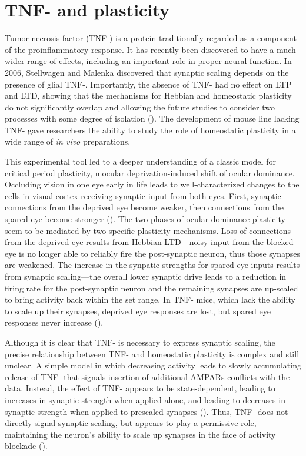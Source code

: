 \section{TNF-\textalpha{} and plasticity}

Tumor necrosis factor \textalpha{} (TNF-\textalpha{}) is a protein traditionally regarded as a component of the proinflammatory response. It has recently been discovered to have a much wider range of effects, including an important role in proper neural function. In 2006, Stellwagen and Malenka discovered that synaptic scaling depends on the presence of glial TNF-\textalpha{}. Importantly, the absence of TNF-\textalpha{} had no effect on LTP and LTD, showing that the mechanisms for Hebbian and homeostatic plasticity do not significantly overlap and allowing the future studies to consider two processes with some degree of isolation (\cite{Stellwagen2006}). The development of mouse line lacking TNF-\textalpha{} gave researchers the ability to study the role of homeostatic plasticity in a wide range of \textit{in vivo} preparations.

This experimental tool led to a deeper understanding of a classic model for critical period plasticity, mocular deprivation-induced shift of ocular dominance. Occluding vision in one eye early in life leads to well-characterized changes to the cells in visual cortex receiving synaptic input from both eyes. First, synaptic connections from the deprived eye become weaker, then connections from the spared eye become stronger (\cite{Frenkel2004}). The two phases of ocular dominance plasticity seem to be mediated by two specific plasticity mechanisms. Loss of connections from the deprived eye results from Hebbian LTD---noisy input from the blocked eye is no longer able to reliably fire the post-synaptic neuron, thus those synapses are weakened. The increase in the synpatic strengths for spared eye inputs results from synaptic scaling---the overall lower synaptic drive leads to a reduction in firing rate for the post-synaptic neuron and the remaining synapses are up-scaled to bring activity back within the set range. In TNF-\textalpha{} mice, which lack the ability to scale up their synapses, deprived eye responses are lost, but spared eye responses never increase (\cite{Kaneko2008}).

Although it is clear that TNF-\textalpha{} is necessary to express synaptic scaling, the precise relationship between TNF-\textalpha{} and homeostatic plasticity is complex and still unclear. A simple model in which decreasing activity leads to slowly accumulating release of TNF-\textalpha{} that signals insertion of additional AMPARs conflicts with the data. Instead, the effect of TNF-\textalpha{} appears to be state-dependent, leading to increases in synaptic strength when applied alone, and leading to decreases in synaptic strength when applied to prescaled synapses (\cite{Steinmetz2010}). Thus, TNF-\textalpha{} does not directly signal synaptic scaling, but appears to play a permissive role, maintaining the neuron's ability to scale up synapses in the face of activity blockade (\cite{Steinmetz2010}).

